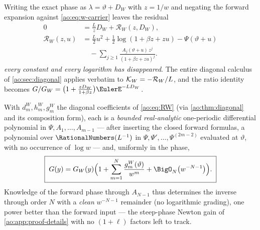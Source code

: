 Writing the exact phase as $\lambda=\vartheta+D_W$ with $z=1/w$ and
negating the forward expansion against \eqref{ao:eq:w-carrier} leaves the
residual
\begin{equation}
 \begin{aligned}
 0&=\frac Lz D_W+\mathcal R_W(z,D_W),\\
 \mathcal R_W(z,u)
 &=\frac L2u^{2}+\frac12\log(1+\beta z+zu)-\Psi(\vartheta+u)\\
 &\quad-\sum_{j\ge1}
   \frac{A_j(\vartheta+u)\,z^{j}}{(1+\beta z+zu)^{j}}.
 \end{aligned}
 \label{ao:eq:RW}
\end{equation}
\emph{every constant and every logarithm has disappeared}.  The
entire diagonal calculus of \cref{ao:sec:diagonal} applies verbatim to
$\mathcal K_W=-\mathcal R_W/L$, and the ratio identity becomes
$G/G_W=\bigl(1+\tfrac{zD_W}{1+\beta z}\bigr)\EulerE^{-LD_W}$.

\begin{theorem}
\label{ao:thm:W-all-orders}
With $d_m^W,h_m^W,g_m^W$ the diagonal coefficients of
\eqref{ao:eq:RW} (via \cref{ao:thm:diagonal} and its composition form),
each is a \emph{bounded real-analytic} one-periodic differential polynomial
in $\Psi,A_1,\dots,A_{m-1}$ --- after inserting the closed forward
formulas, a polynomial over $\RationalNumbers(L^{-1})$ in
$\Psi,\Psi',\dots,\Psi^{(2m-2)}$ evaluated at $\vartheta$, with no
occurrence of $\log w$ --- and, uniformly in the phase,
\begin{equation}
 \boxed{\;
 G(y)=G_W(y)\Bigl(1+\sum_{m=1}^{N}\frac{g_m^W(\vartheta)}{w^{m}}
 +\BigO_N\bigl(w^{-N-1}\bigr)\Bigr).
 \;}
 \label{ao:eq:W-expansion}
\end{equation}
Knowledge of the forward phase through $A_{N-1}$ thus determines the
inverse through order $N$ with a \emph{clean} $w^{-N-1}$ remainder
(no logarithmic grading), one power better than the forward input ---
the steep-phase Newton gain of
\cref{ao:app:proof-details} with no $(1+\ell)$ factors left to track.
\end{theorem}

